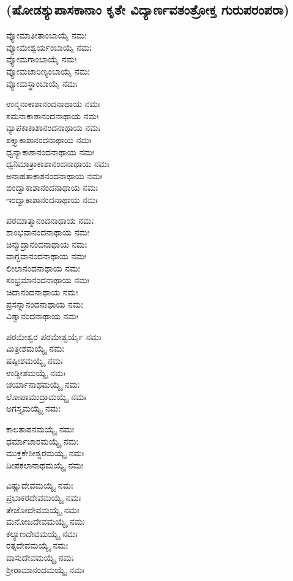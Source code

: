 \subsection{(ಷೋಡಶ್ಯುಪಾಸಕಾನಾಂ ಕೃತೇ ವಿದ್ಯಾರ್ಣವತಂತ್ರೋಕ್ತ ಗುರುಪರಂಪರಾ)}
 ವ್ಯೋಮಾತೀತಾಂಬಾಯೈ ನಮಃ\\
 ವ್ಯೋಮೇಶ್ವರ್ಯಂಬಾಯೈ ನಮಃ\\
 ವ್ಯೋಮಗಾಂಬಾಯೈ ನಮಃ\\
 ವ್ಯೋಮಚಾರಿಣ್ಯಂಬಾಯೈ ನಮಃ\\
 ವ್ಯೋಮಸ್ಥಾಂಬಾಯೈ ನಮಃ

 ಉನ್ಮನಾಕಾಶಾನಂದನಾಥಾಯ ನಮಃ\\
 ಸಮನಾಕಾಶಾನಂದನಾಥಾಯ ನಮಃ\\
 ವ್ಯಾಪಕಾಕಾಶಾನಂದನಾಥಾಯ ನಮಃ\\
 ಶಕ್ತ್ಯಾಕಾಶಾನಂದನಾಥಾಯ ನಮಃ\\
 ಧ್ವನ್ಯಾಕಾಶಾನಂದನಾಥಾಯ ನಮಃ\\
 ಧ್ವನಿಮಾತ್ರಾಕಾಶಾನಂದನಾಥಾಯ ನಮಃ\\
 ಅನಾಹತಾಕಾಶನಂದನಾಥಾಯ ನಮಃ\\
 ಬಿಂದ್ವಾಕಾಶಾನಂದನಾಥಾಯ ನಮಃ\\
 ಇಂದ್ವಾಕಾಶಾನಂದನಾಥಾಯ ನಮಃ

 ಪರಮಾತ್ಮಾನಂದನಾಥಾಯ ನಮಃ\\
 ಶಾಂಭವಾನಂದನಾಥಾಯ ನಮಃ\\
 ಚಿನ್ಮುದ್ರಾನಂದನಾಥಾಯ ನಮಃ\\
 ವಾಗ್ಭವಾನಂದನಾಥಾಯ ನಮಃ\\
 ಲೀಲಾನಂದನಾಥಾಯ ನಮಃ\\
 ಸಂಭ್ರಮಾನಂದನಾಥಾಯ ನಮಃ\\
 ಚಿದಾನಂದನಾಥಾಯ ನಮಃ\\
 ಪ್ರಸನ್ನಾನಂದನಾಥಾಯ ನಮಃ\\
 ವಿಶ್ವಾನಂದನಾಥಾಯ ನಮಃ

 ಪರಮೇಶ್ವರ ಪರಮೇಶ್ವರ್ಯೈ ನಮಃ\\
 ಮಿತ್ರೀಶಮಯ್ಯೈ ನಮಃ\\
 ಷಷ್ಠೀಶಮಯ್ಯೈ ನಮಃ\\
 ಉಡ್ಡೀಶಮಯ್ಯೈ ನಮಃ\\
 ಚರ್ಯಾನಾಥಮಯ್ಯೈ ನಮಃ\\
 ಲೋಪಾಮುದ್ರಾಮಯ್ಯೈ ನಮಃ\\
 ಅಗಸ್ತ್ಯಮಯ್ಯೈ ನಮಃ

 ಕಾಲತಾಪನಮಯ್ಯೈ ನಮಃ\\
 ಧರ್ಮಾಚಾರಮಯ್ಯೈ ನಮಃ\\
 ಮುಕ್ತಕೇಶೀಶ್ವರಮಯ್ಯೈ ನಮಃ\\
 ದೀಪಕಲಾನಾಥಮಯ್ಯೈ ನಮಃ

 ವಿಷ್ಣುದೇವಮಯ್ಯೈ ನಮಃ\\
 ಪ್ರಭಾಕರದೇವಮಯ್ಯೈ ನಮಃ\\
 ತೇಜೋದೇವಮಯ್ಯೈ ನಮಃ\\
 ಮನೋಜದೇವಮಯ್ಯೈ ನಮಃ\\
 ಕಲ್ಯಾಣದೇವಮಯ್ಯೈ ನಮಃ\\
 ರತ್ನದೇವಮಯ್ಯೈ ನಮಃ\\
 ವಾಸುದೇವಮಯ್ಯೈ ನಮಃ\\
 ಶ್ರೀರಾಮಾನಂದಮಯ್ಯೈ ನಮಃ

